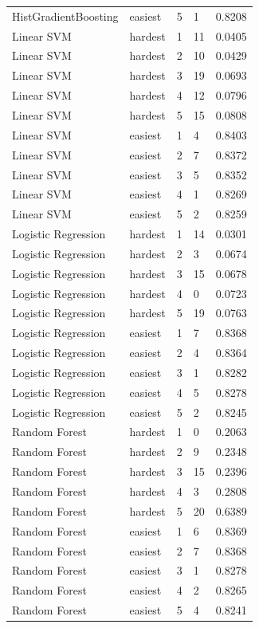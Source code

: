 \begin{tabular}{lllll}
HistGradientBoosting & easiest & 5 & 1 & 0.8208 \\
Linear SVM & hardest & 1 & 11 & 0.0405 \\
Linear SVM & hardest & 2 & 10 & 0.0429 \\
Linear SVM & hardest & 3 & 19 & 0.0693 \\
Linear SVM & hardest & 4 & 12 & 0.0796 \\
Linear SVM & hardest & 5 & 15 & 0.0808 \\
Linear SVM & easiest & 1 & 4 & 0.8403 \\
Linear SVM & easiest & 2 & 7 & 0.8372 \\
Linear SVM & easiest & 3 & 5 & 0.8352 \\
Linear SVM & easiest & 4 & 1 & 0.8269 \\
Linear SVM & easiest & 5 & 2 & 0.8259 \\
Logistic Regression & hardest & 1 & 14 & 0.0301 \\
Logistic Regression & hardest & 2 & 3 & 0.0674 \\
Logistic Regression & hardest & 3 & 15 & 0.0678 \\
Logistic Regression & hardest & 4 & 0 & 0.0723 \\
Logistic Regression & hardest & 5 & 19 & 0.0763 \\
Logistic Regression & easiest & 1 & 7 & 0.8368 \\
Logistic Regression & easiest & 2 & 4 & 0.8364 \\
Logistic Regression & easiest & 3 & 1 & 0.8282 \\
Logistic Regression & easiest & 4 & 5 & 0.8278 \\
Logistic Regression & easiest & 5 & 2 & 0.8245 \\
Random Forest & hardest & 1 & 0 & 0.2063 \\
Random Forest & hardest & 2 & 9 & 0.2348 \\
Random Forest & hardest & 3 & 15 & 0.2396 \\
Random Forest & hardest & 4 & 3 & 0.2808 \\
Random Forest & hardest & 5 & 20 & 0.6389 \\
Random Forest & easiest & 1 & 6 & 0.8369 \\
Random Forest & easiest & 2 & 7 & 0.8368 \\
Random Forest & easiest & 3 & 1 & 0.8278 \\
Random Forest & easiest & 4 & 2 & 0.8265 \\
Random Forest & easiest & 5 & 4 & 0.8241 \\
\bottomrule
\end{tabular}
